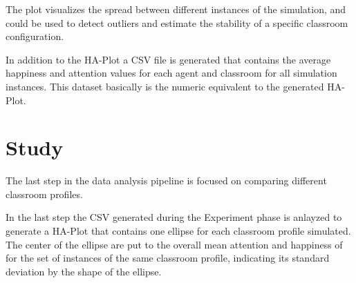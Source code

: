 The plot visualizes the spread between different instances of the simulation, and
could be used to detect outliers and estimate the stability of a specific classroom
configuration.

In addition to the HA-Plot a CSV file is generated that contains the average
happiness and attention values for each agent and classroom for all simulation instances.
This dataset basically is the numeric equivalent to the generated HA-Plot.

\section{Study}
The last step in the data analysis pipeline is focused on comparing different classroom
profiles.

\begin{figure}[H]
\end{figure}

In the last step the CSV generated during the Experiment phase is anlayzed to
generate a HA-Plot that contains one ellipse for each classroom profile simulated.
The center of the ellipse are put to the overall mean attention and happiness
of for the set of instances of the same classroom profile, indicating its standard
deviation by the shape of the ellipse.
